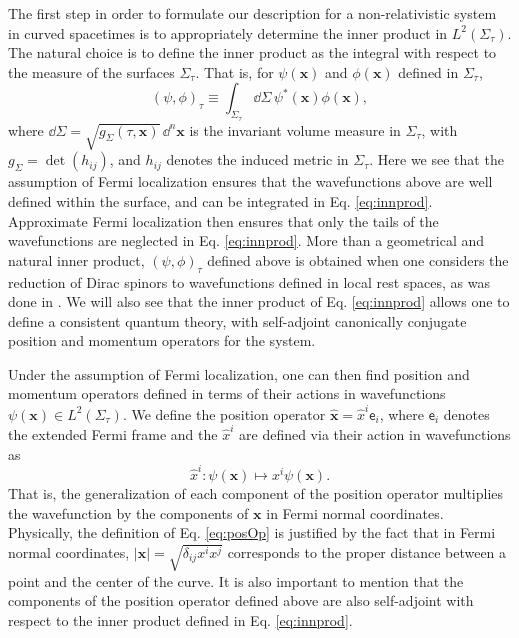 \documentclass[prd,twocolumn,superscriptaddress,floatfix,amsmath,amssymb,amsfonts,longbibliography,nofootinbib]{revtex4-1}
\newcommand{\mf}{\mathsf}%
\begin{document}
The first step in order to formulate our description for a non-relativistic system in curved spacetimes is to appropriately determine the inner product in $L^2(\Sigma_\tau)$. The natural choice is to define the inner product as the integral with respect to the measure of the surfaces $\Sigma_\tau$. That is, for $\psi(\bm x)$ and $\phi(\bm x)$ defined in $\Sigma_\tau$,
\begin{equation}\label{eq:innprod}
    (\psi,\phi)_\tau \equiv \int_{\Sigma_\tau} \dd \Sigma \, \psi^*(\bm x) \phi(\bm x),
\end{equation}
where $\dd \Sigma = \sqrt{g_\Sigma(\tau,\bm x)}\,\dd^n \bm x$ is the invariant volume measure in $\Sigma_\tau$, with $g_\Sigma = \det (h_{ij})$, and $h_{ij}$ denotes the induced metric in $\Sigma_\tau$. Here we see that the assumption of Fermi localization ensures that the wavefunctions above are well defined within the surface, and can be integrated in Eq. \eqref{eq:innprod}. Approximate Fermi localization then ensures that only the tails of the wavefunctions are neglected in Eq. \eqref{eq:innprod}. More than a geometrical and natural inner product, $(\psi,\phi)_\tau$ defined above is obtained when one considers the reduction of Dirac spinors to wavefunctions defined in local rest spaces, as was done in \cite{jonas}. We will also see that the inner product of Eq. \eqref{eq:innprod} allows one to define a consistent quantum theory, with self-adjoint canonically conjugate position and momentum operators for the system.

Under the assumption of Fermi localization, one can then find position and momentum operators defined in terms of their actions in wavefunctions $\psi(\bm x)\in L^2(\Sigma_\tau)$. We define the position operator $\hat{\bm x} = \hat{x}^i \mathsf{e}_i$, where $\mf{e}_i$ denotes the extended Fermi frame and the $\hat{x}^i$ are defined via their action in wavefunctions as
\begin{equation}\label{eq:posOp}
    \hat{x}^i:\psi(\bm x)\longmapsto x^i \psi(\bm x).
\end{equation}
That is, the generalization of each component of the position operator multiplies the wavefunction by the components of $\bm x$ in Fermi normal coordinates. Physically, the definition of Eq. \eqref{eq:posOp} is justified by the fact that in Fermi normal coordinates, $|\bm x|=\sqrt{\delta_{ij}x^ix^j}$ corresponds to the proper distance between a point and the center of the curve. It is also important to mention that the components of the position operator defined above are also self-adjoint with respect to the inner product defined in Eq. \eqref{eq:innprod}.
\end{document}
